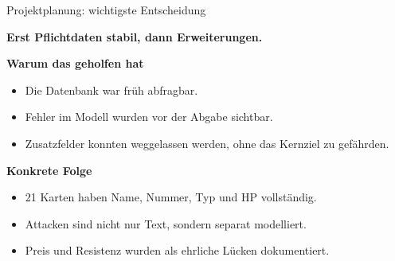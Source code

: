 \documentclass[aspectratio=169,11pt]{beamer}
\begin{document}
\begin{frame}{Projektplanung: wichtigste Entscheidung}
  \begin{panel}[colback=softblue,colframe=blue!35]
    {\Large\bfseries Erst Pflichtdaten stabil, dann Erweiterungen.}
  \end{panel}
  \vspace{0.45cm}
  \begin{minipage}[t]{0.48\textwidth}
    \begin{panel}
      {\bfseries Warum das geholfen hat}\par
      \begin{itemize}
        \item Die Datenbank war fr\"uh abfragbar.
        \item Fehler im Modell wurden vor der Abgabe sichtbar.
        \item Zusatzfelder konnten weggelassen werden, ohne das Kernziel zu gef\"ahrden.
      \end{itemize}
    \end{panel}
  \end{minipage}\hfill
  \begin{minipage}[t]{0.48\textwidth}
    \begin{panel}
      {\bfseries Konkrete Folge}\par
      \begin{itemize}
        \item 21 Karten haben Name, Nummer, Typ und HP vollst\"andig.
        \item Attacken sind nicht nur Text, sondern separat modelliert.
        \item Preis und Resistenz wurden als ehrliche L\"ucken dokumentiert.
      \end{itemize}
    \end{panel}
  \end{minipage}
\end{frame}
\end{document}
